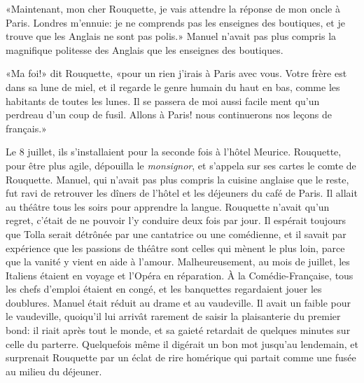 «Maintenant, mon cher Rouquette, je vais attendre la réponse de mon oncle à Paris. Londres m'ennuie: je ne comprends pas les enseignes des boutiques, et je trouve que les Anglais ne sont pas polis.» Manuel n'avait pas plus compris la magnifique politesse des Anglais que les enseignes des boutiques.

«Ma foi!» dit Rouquette, «pour un rien j'irais à Paris avec vous. Votre frère est dans sa lune de miel, et il regarde le genre humain du haut en bas, comme les habitants de toutes les lunes. Il se passera de moi aussi facile ment qu'un perdreau d'un coup de fusil. Allons à Paris! nous continuerons nos leçons de français.»

Le 8 juillet, ils s'installaient pour la seconde fois à l'hôtel Meurice. Rouquette, pour être plus agile, dépouilla le \emph{monsignor}, et s'appela sur ses cartes le comte de Rouquette. Manuel, qui n'avait pas plus compris la cuisine anglaise que le reste, fut ravi de retrouver les dîners de l'hôtel et les déjeuners du café de Paris. Il allait au théâtre tous les soirs pour apprendre la langue. Rouquette n'avait qu'un regret, c'était de ne pouvoir l'y conduire deux fois par jour. Il espérait toujours que Tolla serait détrônée par une cantatrice ou une comédienne, et il savait par expérience que les passions de théâtre sont celles qui mènent le plus loin, parce que la vanité y vient en aide à l'amour. Malheureusement, au mois de juillet, les Italiens étaient en voyage et l'Opéra en réparation. À la Comédie-Française, tous les chefs d'emploi étaient en congé, et les banquettes regardaient jouer les doublures. Manuel était réduit au drame et au vaudeville. Il avait un faible pour le vaudeville, quoiqu'il lui arrivât rarement de saisir la plaisanterie du premier bond: il riait après tout le monde, et sa gaieté retardait de quelques minutes sur celle du parterre. Quelquefois même il digérait un bon mot jusqu'au lendemain, et surprenait Rouquette par un éclat de rire homérique qui partait comme une fusée au milieu du déjeuner.

